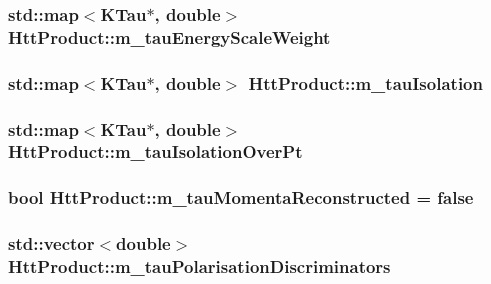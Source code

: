 \label{classHttProduct_a5d765e15fd61df93b581ac259fffa8bc}
\hypertarget{classHttProduct_ae3eb0ecf3e4e1bfeb79cb090e6224582}{
\subsubsection[{m\_\-tauEnergyScaleWeight}]{\setlength{\rightskip}{0pt plus 5cm}std::map$<$KTau$\ast$, double$>$ {\bf HttProduct::m\_\-tauEnergyScaleWeight}}}
\label{classHttProduct_ae3eb0ecf3e4e1bfeb79cb090e6224582}
\hypertarget{classHttProduct_a367ae5e6dcf667daf5a392d6f6161222}{
\subsubsection[{m\_\-tauIsolation}]{\setlength{\rightskip}{0pt plus 5cm}std::map$<$KTau$\ast$, double$>$ {\bf HttProduct::m\_\-tauIsolation}}}
\label{classHttProduct_a367ae5e6dcf667daf5a392d6f6161222}
\hypertarget{classHttProduct_a58eff332aabde35e468ae2ef115696b2}{
\subsubsection[{m\_\-tauIsolationOverPt}]{\setlength{\rightskip}{0pt plus 5cm}std::map$<$KTau$\ast$, double$>$ {\bf HttProduct::m\_\-tauIsolationOverPt}}}
\label{classHttProduct_a58eff332aabde35e468ae2ef115696b2}
\hypertarget{classHttProduct_ab784e7805f945bedf6e2cc3ee39f7112}{
\subsubsection[{m\_\-tauMomentaReconstructed}]{\setlength{\rightskip}{0pt plus 5cm}bool {\bf HttProduct::m\_\-tauMomentaReconstructed} = false}}
\label{classHttProduct_ab784e7805f945bedf6e2cc3ee39f7112}
\hypertarget{classHttProduct_aa0c3f0fdfab21ffb2f82fd856dc54410}{
\subsubsection[{m\_\-tauPolarisationDiscriminators}]{\setlength{\rightskip}{0pt plus 5cm}std::vector$<$double$>$ {\bf HttProduct::m\_\-tauPolarisationDiscriminators}}}
